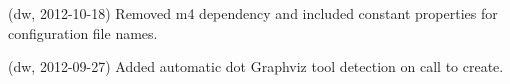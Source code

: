
\begin{DoxyRefList}
\item[\label{changelog1_4__changelog1_4000001}%
\Hypertarget{changelog1_4__changelog1_4000001}%
Class \hyperlink{class_matlab_doc_maker}{Matlab\+Doc\+Maker} ](dw, 2012-\/10-\/18) Removed {\ttfamily m4} dependency and included constant properties for configuration file names.

(dw, 2012-\/09-\/27) Added automatic dot Graphviz tool detection on call to create.
\end{DoxyRefList}